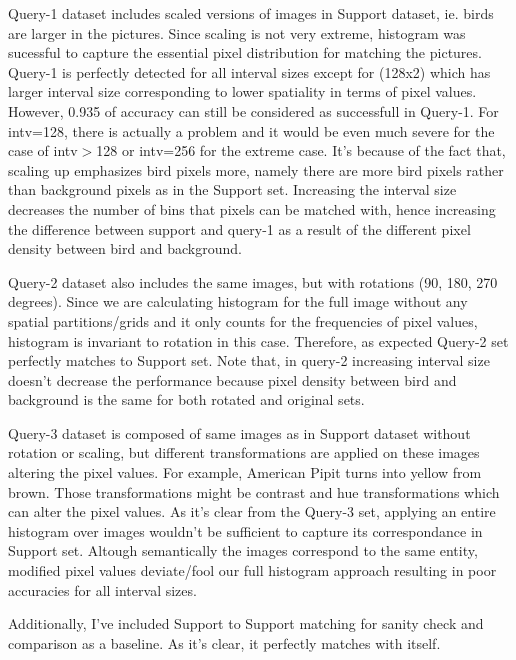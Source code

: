 \documentclass[12pt]{article}
\begin{document}
\vspace{1cm}


Query-1 dataset includes scaled versions of images in Support dataset, 
ie. birds are larger in the pictures.
Since scaling is not very extreme, histogram was sucessful to capture the essential
pixel distribution for matching the pictures. Query-1 is perfectly detected for all interval sizes 
except for (128x2) which has larger interval size corresponding to lower spatiality 
in terms of pixel values. However, 0.935 of accuracy can still be considered as successfull in Query-1.
For intv=128, there is actually a problem and it would be even much severe for the case of intv$>$128 or intv=256 for the extreme case.
It's because of the fact that, scaling up emphasizes bird pixels more, namely there are more bird pixels 
rather than background pixels as in the Support set. Increasing the interval size 
decreases the number of bins that pixels can be matched with, hence increasing the difference between
support and query-1 as a result of the different pixel density between bird and background.

Query-2 dataset also includes the same images, but with rotations (90, 180, 270 degrees).
Since we are calculating histogram for the full image without any spatial partitions/grids
and it only counts for the frequencies of pixel values, histogram is invariant to rotation in this case.
Therefore, as expected Query-2 set perfectly matches to Support set.
Note that, in query-2 increasing interval size doesn't decrease the performance because pixel density 
between bird and background is the same for both rotated and original sets.

Query-3 dataset is composed of same images as in Support dataset without rotation or scaling,
but different transformations are applied on these images altering the pixel values. 
For example, American Pipit turns into yellow from brown. Those transformations might 
be contrast and hue transformations which can alter the pixel values. 
As it's clear from the Query-3 set, applying an entire histogram over images wouldn't be sufficient 
to capture its correspondance in Support set. Altough semantically the images correspond to the 
same  entity, modified pixel values deviate/fool our full histogram approach resulting in poor accuracies
for all interval sizes.


Additionally, I've included Support to Support matching for 
sanity check and comparison as a baseline. As it's clear, it perfectly matches with itself.
\end{document}
